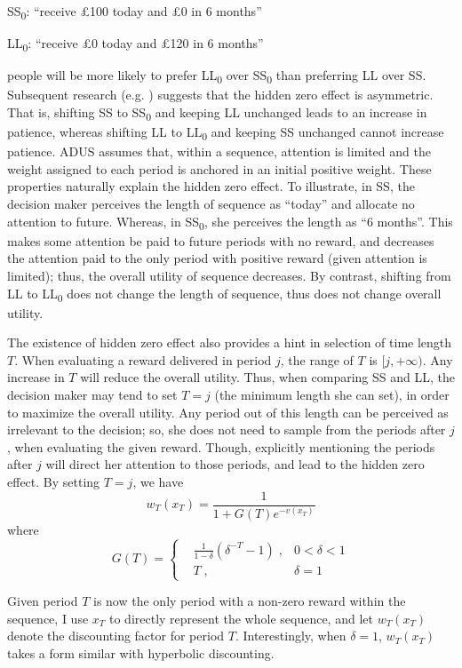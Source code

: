 \documentclass[
  12pt,
]{article}
\begin{document}
SS\textsubscript{0}: ``receive £100 today and £0 in 6 months''

LL\textsubscript{0}: ``receive £0 today and £120 in 6 months''

people will be more likely to prefer LL\textsubscript{0} over
SS\textsubscript{0} than preferring LL over SS. Subsequent research
(e.g. \citet{read_value_2017}) suggests that the hidden zero effect is
asymmetric. That is, shifting SS to SS\textsubscript{0} and keeping LL
unchanged leads to an increase in patience, whereas shifting LL to
LL\textsubscript{0} and keeping SS unchanged cannot increase patience.
ADUS assumes that, within a sequence, attention is limited and the
weight assigned to each period is anchored in an initial positive
weight. These properties naturally explain the hidden zero effect. To
illustrate, in SS, the decision maker perceives the length of sequence
as ``today'' and allocate no attention to future. Whereas, in
SS\textsubscript{0}, she perceives the length as ``6 months''. This
makes some attention be paid to future periods with no reward, and
decreases the attention paid to the only period with positive reward
(given attention is limited); thus, the overall utility of sequence
decreases. By contrast, shifting from LL to LL\textsubscript{0} does not
change the length of sequence, thus does not change overall utility.

The existence of hidden zero effect also provides a hint in selection of
time length \(T\). When evaluating a reward delivered in period \(j\),
the range of \(T\) is \([j,+\infty)\). Any increase in \(T\) will reduce
the overall utility. Thus, when comparing SS and LL, the decision maker
may tend to set \(T=j\) (the minimum length she can set), in order to
maximize the overall utility. Any period out of this length can be
perceived as irrelevant to the decision; so, she does not need to sample
from the periods after \(j\), when evaluating the given reward. Though,
explicitly mentioning the periods after \(j\) will direct her attention
to those periods, and lead to the hidden zero effect. By setting
\(T=j\), we
have\[ w_T(x_T) = \frac{1}{1+G(T)e^{-v(x_T)}} \]where\[ G(T) = \left\{ \begin{aligned} & \frac{1}{1-\delta}(\delta^{-T}-1) \; ,& 0<\delta<1\\ & T\; ,& \delta=1\ \end{aligned} \right. \]

Given period \(T\) is now the only period with a non-zero reward within
the sequence, I use \(x_T\) to directly represent the whole sequence,
and let \(w_T(x_T)\) denote the discounting factor for period \(T\).
Interestingly, when \(\delta=1\), \(w_T(x_T)\) takes a form similar with
hyperbolic discounting.
\end{document}
